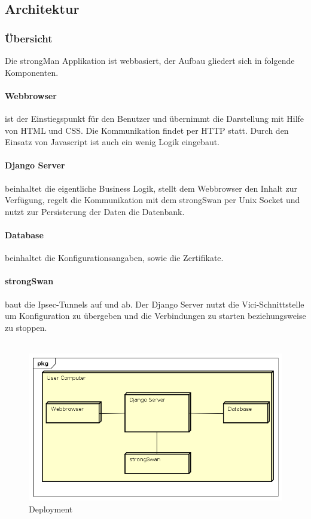 \subsection{Architektur}

\subsubsection{Übersicht}
Die strongMan Applikation ist webbasiert, der Aufbau gliedert sich in folgende Komponenten.

\paragraph{Webbrowser} ist der Einstiegspunkt für den Benutzer und übernimmt die Darstellung mit Hilfe von HTML und CSS. Die Kommunikation findet per HTTP statt. Durch den Einsatz von Javascript ist auch ein wenig Logik eingebaut.  

\paragraph{Django Server} beinhaltet die eigentliche Business Logik,  stellt dem Webbrowser den Inhalt zur Verfügung, regelt die Kommunikation mit dem strongSwan per Unix Socket und nutzt zur Persisterung der Daten die Datenbank.

\paragraph{Database} beinhaltet die Konfigurationsangaben, sowie die Zertifikate.

\paragraph{strongSwan} baut die Ipsec-Tunnels auf und ab. Der Django Server nutzt die Vici-Schnittstelle um Konfiguration zu übergeben und die Verbindungen zu starten beziehungsweise zu stoppen. \\\\


\begin{figure}[H]
\centering
\includegraphics[width=360pt]{images/deployment.png}
\caption[Deployment]{Deployment}
\end{figure}


